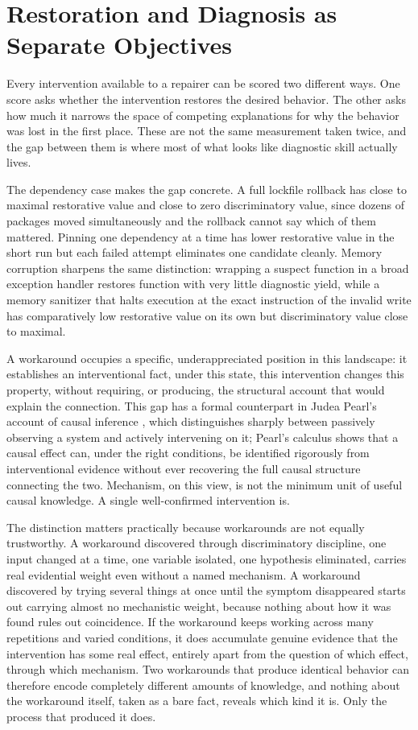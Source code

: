 \section{Restoration and Diagnosis as Separate Objectives}

Every intervention available to a repairer can be scored two different ways. One score asks whether the intervention restores the desired behavior. The other asks how much it narrows the space of competing explanations for why the behavior was lost in the first place. These are not the same measurement taken twice, and the gap between them is where most of what looks like diagnostic skill actually lives.

The dependency case makes the gap concrete. A full lockfile rollback has close to maximal restorative value and close to zero discriminatory value, since dozens of packages moved simultaneously and the rollback cannot say which of them mattered. Pinning one dependency at a time has lower restorative value in the short run but each failed attempt eliminates one candidate cleanly. Memory corruption sharpens the same distinction: wrapping a suspect function in a broad exception handler restores function with very little diagnostic yield, while a memory sanitizer that halts execution at the exact instruction of the invalid write has comparatively low restorative value on its own but discriminatory value close to maximal.

A workaround occupies a specific, underappreciated position in this landscape: it establishes an interventional fact, under this state, this intervention changes this property, without requiring, or producing, the structural account that would explain the connection. This gap has a formal counterpart in Judea Pearl's account of causal inference \cite{pearl2009}, which distinguishes sharply between passively observing a system and actively intervening on it; Pearl's calculus shows that a causal effect can, under the right conditions, be identified rigorously from interventional evidence without ever recovering the full causal structure connecting the two. Mechanism, on this view, is not the minimum unit of useful causal knowledge. A single well-confirmed intervention is.

The distinction matters practically because workarounds are not equally trustworthy. A workaround discovered through discriminatory discipline, one input changed at a time, one variable isolated, one hypothesis eliminated, carries real evidential weight even without a named mechanism. A workaround discovered by trying several things at once until the symptom disappeared starts out carrying almost no mechanistic weight, because nothing about how it was found rules out coincidence. If the workaround keeps working across many repetitions and varied conditions, it does accumulate genuine evidence that the intervention has some real effect, entirely apart from the question of which effect, through which mechanism. Two workarounds that produce identical behavior can therefore encode completely different amounts of knowledge, and nothing about the workaround itself, taken as a bare fact, reveals which kind it is. Only the process that produced it does.

